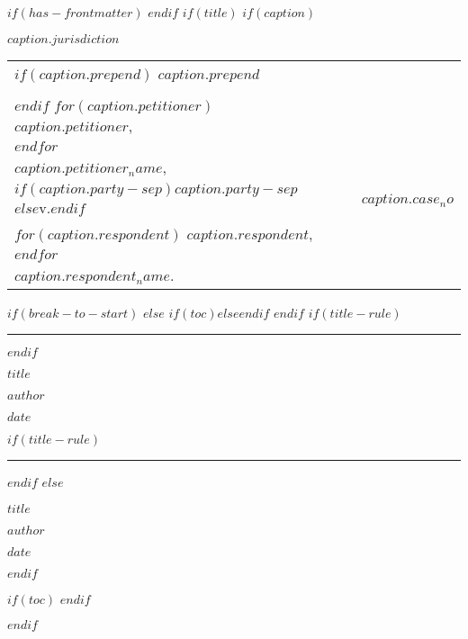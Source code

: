 $if(has-frontmatter)$
\frontmatter
$endif$
$if(title)$
\thispagestyle{empty}
$if(caption)$
\begin{center}\bfseries
    $caption.jurisdiction$
\end{center}

\vspace{1em}

\setlength{\tabcolsep}{0em}
\setlength{\parindent}{0em}
\begin{tabular}{p{} p{} | p{} p{}}
    \vspace{0.5em}
    $if(caption.prepend)$
    $caption.prepend$ &&& \\ &&& \\
    $endif$
    $for(caption.petitioner)$
    $caption.petitioner$, &&& \\
    $endfor$ &&& \\
    \hspace{5em}\textit{$caption.petitioner_name$}, & & & \\
    \vspace{0.5em}
    \hspace{2em}$if(caption.party-sep)$$caption.party-sep$$else$v.$endif$ & & &
    \vspace{0.5em} $caption.case_no$ \\
    \vspace{1em}
    $for(caption.respondent)$
    $caption.respondent$, &&& \\
    $endfor$ &&& \\
    \hspace{5em}\textit{$caption.respondent_name$}.
    & & &
    \vspace*{1em} \\
    \cline{1-2}
\end{tabular}
\setlength{\parindent}{0.5in}

\vspace{2em}

$if(break-to-start)$
\vspace{2em}
$else$
$if(toc)$\vspace{2em}$else$\vspace{0.5em}$endif$
$endif$
$if(title-rule)$
\hrule
$endif$
\begin{center}\bfseries
    \MakeUppercase{$title$}

    $author$

    $date$
\end{center}
$if(title-rule)$
\hrule
$endif$
$else$
\vspace*{2in}
\begin{center}\bfseries
    $title$

    $author$

    \vspace{1em}

    $date$
\end{center}
$endif$

$if(toc)$
\clearpage
$endif$

$endif$
